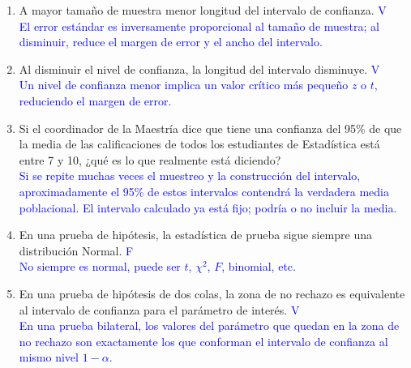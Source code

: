 \documentclass[12pt]{article}
\begin{document}
\begin{enumerate}
	\item A mayor tamaño de muestra menor longitud del intervalo de confianza. \hfill \textcolor{blue}{V}\\[0.2cm]
	      \textcolor{blue}{El error estándar es inversamente proporcional al tamaño de muestra; al disminuir, reduce el margen de error y el ancho del intervalo.}
	\item Al disminuir el nivel de confianza, la longitud del intervalo disminuye. \hfill \textcolor{blue}{V}\\[0.2cm]
	      \textcolor{blue}{Un nivel de confianza menor implica un valor crítico más pequeño \(z\) o \(t\), reduciendo el margen de error.}

	\item Si el coordinador de la Maestría dice que tiene una confianza del 95\% de que
	      la media de las calificaciones de todos los estudiantes de Estadística está
	      entre 7 y 10, ¿qué es lo que realmente está diciendo?\\[0.2cm]
	      \textcolor{blue}{Si se repite muchas veces el muestreo y la construcción del intervalo, aproximadamente el 95\% de estos intervalos contendrá la verdadera media poblacional. El intervalo calculado ya está fijo; podría o no incluir la media.}
	\item En una prueba de hipótesis, la estadística de prueba sigue siempre una
	      distribución Normal. \hfill \textcolor{blue}{F}\\[0.2cm]
	      \textcolor{blue}{No siempre es normal, puede ser \(t\), \(\chi^{2}\), \(F\), binomial, etc.}
	\item En una prueba de hipótesis de dos colas, la zona de no rechazo es equivalente
	      al intervalo de confianza para el parámetro de interés. \hfill \textcolor{blue}{V}\\[0.2cm]
	      \textcolor{blue}{En una prueba bilateral, los valores del parámetro que quedan en la zona de no rechazo son exactamente los que conforman el intervalo de confianza al mismo nivel \(1-\alpha\).}
\end{enumerate}
\end{document}

